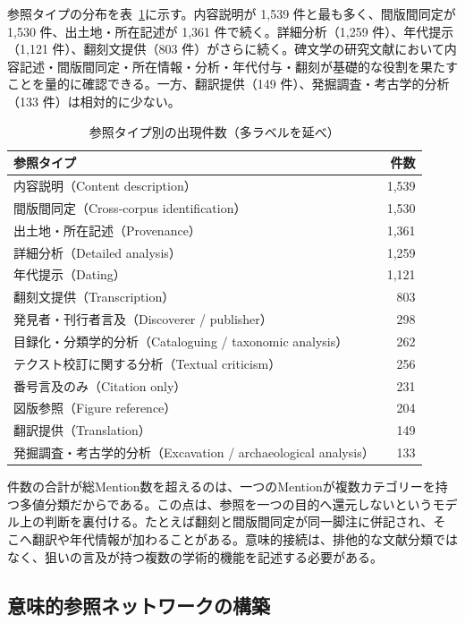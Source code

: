 参照タイプの分布を表~\ref{tab:ch5-types}に示す。内容説明が 1,539 件と最も多く、間版間同定が 1,530 件、出土地・所在記述が 1,361 件で続く。詳細分析（1,259 件）、年代提示（1,121 件）、翻刻文提供（803 件）がさらに続く。碑文学の研究文献において内容記述・間版間同定・所在情報・分析・年代付与・翻刻が基礎的な役割を果たすことを量的に確認できる。一方、翻訳提供（149 件）、発掘調査・考古学的分析（133 件）は相対的に少ない。

\begin{table}[htbp]
  \centering
  \caption{参照タイプ別の出現件数（多ラベルを延べ）}
  \label{tab:ch5-types}
  \begin{tabular}{lr}
    \hline
    参照タイプ & 件数 \\
    \hline
    内容説明（Content description） & 1,539 \\
    間版間同定（Cross-corpus identification） & 1,530 \\
    出土地・所在記述（Provenance） & 1,361 \\
    詳細分析（Detailed analysis） & 1,259 \\
    年代提示（Dating） & 1,121 \\
    翻刻文提供（Transcription） & 803 \\
    発見者・刊行者言及（Discoverer / publisher） & 298 \\
    目録化・分類学的分析（Cataloguing / taxonomic analysis） & 262 \\
    テクスト校訂に関する分析（Textual criticism） & 256 \\
    番号言及のみ（Citation only） & 231 \\
    図版参照（Figure reference） & 204 \\
    翻訳提供（Translation） & 149 \\
    発掘調査・考古学的分析（Excavation / archaeological analysis） & 133 \\
    \hline
  \end{tabular}
\end{table}

件数の合計が総Mention数を超えるのは、一つのMentionが複数カテゴリーを持つ多値分類だからである。この点は、参照を一つの目的へ還元しないというモデル上の判断を裏付ける。たとえば翻刻と間版間同定が同一脚注に併記され、そこへ翻訳や年代情報が加わることがある。意味的接続は、排他的な文献分類ではなく、狙いの言及が持つ複数の学術的機能を記述する必要がある。

\subsection{意味的参照ネットワークの構築}

